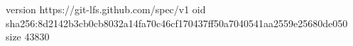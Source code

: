 version https://git-lfs.github.com/spec/v1
oid sha256:8d2142b3cb0cb8032a14fa70c46cf170437ff50a7040541aa2559e25680de050
size 43830
